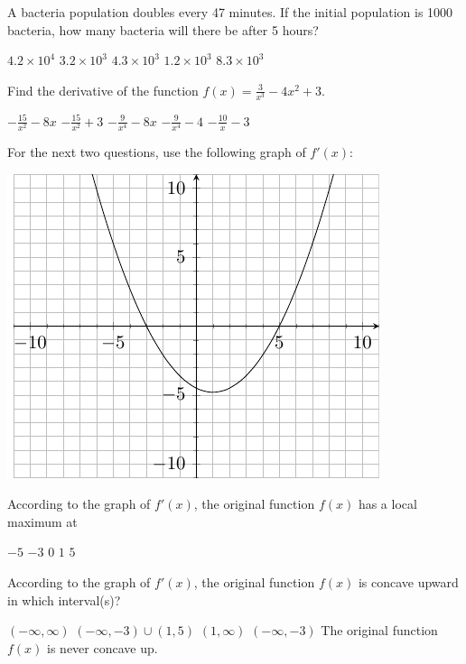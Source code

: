 \documentclass[11pt]{article}
\begin{document}
\begin{questions}
\begin{multiplechoice}{5}
\question A bacteria population doubles every 47 minutes.  If the initial population is 1000 bacteria, how many bacteria will there be after 5 hours?
\begin{answers}{3}
\ans $4.2 \times 10^4$
\ans $3.2 \times 10^3$
\ans $4.3 \times 10^3$
\ans $1.2 \times 10^3$
\ans $8.3 \times 10^3$
\end{answers}



\question Find the derivative of the function $f(x) = \frac{3}{x^3} - 4x^2 + 3$.
\begin{answers}{2}
\ans $-\frac{15}{x^2} - 8x$
\ans $-\frac{15}{x^2} + 3$
\ans $-\frac{9}{x^4} -8x$
\ans $-\frac{9}{x^4} - 4$
\ans $-\frac{10}{x} - 3$
\end{answers}

\newpage


For the next two questions, use the following graph of $f'(x)$:\\


\begin{minipage}{\linewidth}%
\centering
\makebox[\linewidth]{}
\includegraphics{finalgraph3.pdf}
\label{graph1exam1}%
\end{minipage}


\question According to the graph of $f'(x)$, the original function $f(x)$ has a local maximum at
\begin{answers}{3}
\ans $-5$
\ans $-3$
\ans $0$
\ans $1$
\ans $5$
\end{answers}


\question According to the graph of $f'(x)$, the original function $f(x)$ is concave upward in which interval(s)?
\begin{answers}{2}
\ans $(-\infty, \infty)$
\ans $(-\infty, -3) \cup (1,5)$
\ans $(1, \infty)$
\ans $(-\infty, -3)$
\ans The original function $f(x)$ is never concave up.
\end{answers}




\end{multiplechoice}
\end{questions}
\end{document}
